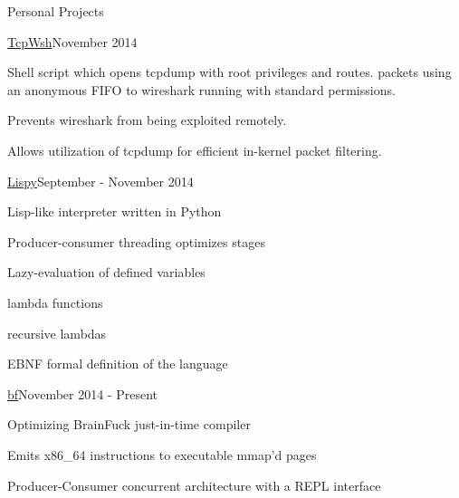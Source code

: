 \documentclass{resume} %
\begin{document}
\begin{rSection}{Personal Projects}

\begin{rSubsection}{\href{http://github.com/cptaffe/tcpwsh}{TcpWsh}}{November 2014}{}{}

	\item Shell script which opens tcpdump with root privileges and routes. packets using an anonymous FIFO to wireshark running with standard permissions.
	\item Prevents wireshark from being exploited remotely.
	\item Allows utilization of tcpdump for efficient in-kernel packet filtering.
\end{rSubsection}

\begin{rSubsection}{\href{http://github.com/cptaffe/lispy}{Lispy}}{September - November 2014}{}{}

	\item Lisp-like interpreter written in Python
	\item Producer-consumer threading optimizes stages
	\item Lazy-evaluation of defined variables
	\item lambda functions
	\item recursive lambdas
	\item EBNF formal definition of the language
\end{rSubsection}

\begin{rSubsection}{\href{http://github.com/cptaffe/bf}{bf}}{November 2014 - Present}{}{}

	\item Optimizing BrainFuck just-in-time compiler
	\item Emits x86\_64 instructions to executable mmap'd pages
	\item Producer-Consumer concurrent architecture with a REPL interface
\end{rSubsection}

\end{rSection}

\end{document}
